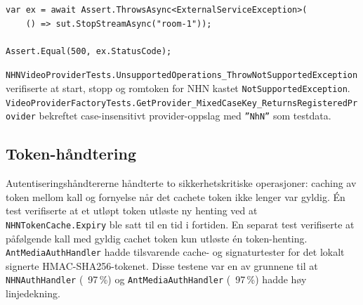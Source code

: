 \begin{lstlisting}[language={[Sharp]C},
  caption={StopStreamAsync — upstream 500 kaster ExternalServiceException}]
var ex = await Assert.ThrowsAsync<ExternalServiceException>(
    () => sut.StopStreamAsync("room-1"));

Assert.Equal(500, ex.StatusCode);
\end{lstlisting}

\texttt{NHNVideoProviderTests.UnsupportedOperations\_ThrowNotSupportedException}
verifiserte at start, stopp og romtoken for NHN kastet
\texttt{NotSupportedException}.
\texttt{VideoProviderFactoryTests.GetProvider\_MixedCaseKey\_ReturnsRegisteredProvider} bekreftet case-insensitivt provider-oppslag med \texttt{''NhN''} som testdata.

\subsection{Token-håndtering}
\label{subsec:token-haandtering}

Autentiseringshåndtererne håndterte to sikkerhetskritiske operasjoner:
caching av token mellom kall og fornyelse når det cachete token ikke
lenger var gyldig. Én test verifiserte at et utløpt token utløste ny
henting ved at \texttt{NHNTokenCache.Expiry} ble satt til en tid i
fortiden. En separat test verifiserte at påfølgende kall med gyldig
cachet token kun utløste én token-henting.
\texttt{AntMediaAuthHandler} hadde tilsvarende cache- og signaturtester
for det lokalt signerte HMAC-SHA256-tokenet. Disse testene var en av
grunnene til at \texttt{NHNAuthHandler} (~97\,\%) og
\texttt{AntMediaAuthHandler} (~97\,\%) hadde høy linjedekning.